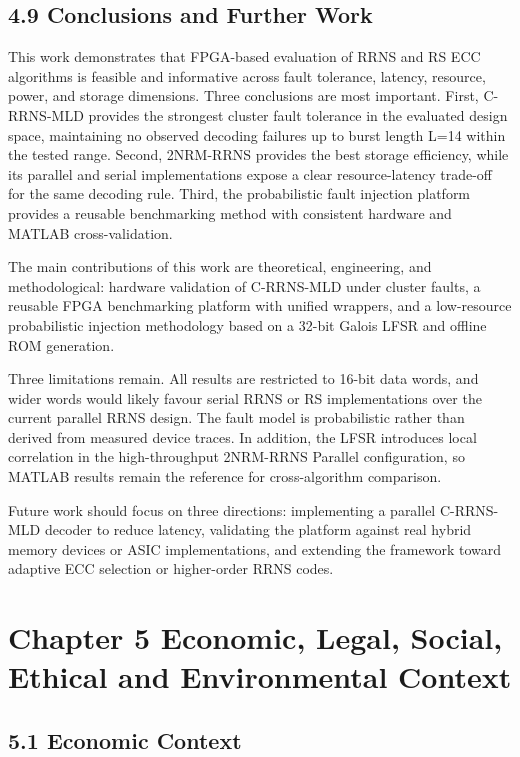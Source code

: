 \subsection{4.9 Conclusions and Further
Work}\label{conclusions-and-further-work}

This work demonstrates that FPGA-based evaluation of RRNS and RS ECC
algorithms is feasible and informative across fault tolerance, latency,
resource, power, and storage dimensions. Three conclusions are most
important. First, C-RRNS-MLD provides the strongest cluster fault
tolerance in the evaluated design space, maintaining no observed
decoding failures up to burst length L=14 within the tested range.
Second, 2NRM-RRNS provides the best storage efficiency, while its
parallel and serial implementations expose a clear resource-latency
trade-off for the same decoding rule. Third, the probabilistic fault
injection platform provides a reusable benchmarking method with
consistent hardware and MATLAB cross-validation.

The main contributions of this work are theoretical, engineering, and
methodological: hardware validation of C-RRNS-MLD under cluster faults,
a reusable FPGA benchmarking platform with unified wrappers, and a
low-resource probabilistic injection methodology based on a 32-bit
Galois LFSR and offline ROM generation.

Three limitations remain. All results are restricted to 16-bit data
words, and wider words would likely favour serial RRNS or RS
implementations over the current parallel RRNS design. The fault model
is probabilistic rather than derived from measured device traces. In
addition, the LFSR introduces local correlation in the high-throughput
2NRM-RRNS Parallel configuration, so MATLAB results remain the reference
for cross-algorithm comparison.

Future work should focus on three directions: implementing a parallel
C-RRNS-MLD decoder to reduce latency, validating the platform against
real hybrid memory devices or ASIC implementations, and extending the
framework toward adaptive ECC selection or higher-order RRNS codes.

\section{Chapter 5 Economic, Legal, Social, Ethical and Environmental
Context}\label{chapter-5-economic-legal-social-ethical-and-environmental-context}

\subsection{5.1 Economic Context}\label{economic-context}

